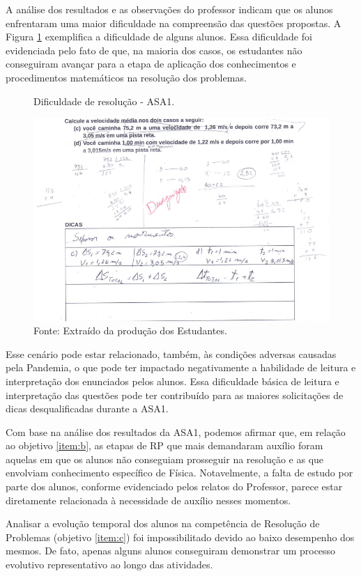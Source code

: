 A análise dos resultados e as observações do professor indicam que os alunos enfrentaram uma maior dificuldade na compreensão das questões propostas. A Figura \ref{fig:difasa1} exemplifica a dificuldade de alguns alunos. Essa dificuldade foi evidenciada pelo fato de que, na maioria dos casos, os estudantes não conseguiram avançar para a etapa de aplicação dos conhecimentos e procedimentos matemáticos na resolução dos problemas. 

\begin{figure}
    \centering
    \caption{Dificuldade de resolução -  ASA1.}
    \includegraphics[width=1\textwidth]{fig/difasa1.png}
    \caption*{Fonte: Extraído da produção dos Estudantes.}
    \label{fig:difasa1}
\end{figure}

Esse cenário pode estar relacionado, também, às condições adversas causadas pela Pandemia, o que pode ter impactado negativamente a habilidade de leitura e interpretação dos enunciados pelos alunos. Essa dificuldade básica de leitura e interpretação das questões pode ter contribuído para as maiores solicitações de dicas desqualificadas durante a ASA1.

Com base na análise dos resultados da ASA1, podemos afirmar que, em relação ao objetivo \ref{item:b}, as etapas de RP que mais demandaram auxílio foram aquelas em que os alunos não conseguiam prosseguir na resolução e as que envolviam conhecimento específico de Física. Notavelmente, a falta de estudo por parte dos alunos, conforme evidenciado pelos relatos do Professor, parece estar diretamente relacionada à necessidade de auxílio nesses momentos.

Analisar a evolução temporal dos alunos na competência de Resolução de Problemas (objetivo \ref{item:c}) foi impossibilitado devido ao baixo desempenho dos mesmos. De fato, apenas alguns alunos conseguiram demonstrar um processo evolutivo representativo ao longo das atividades.

